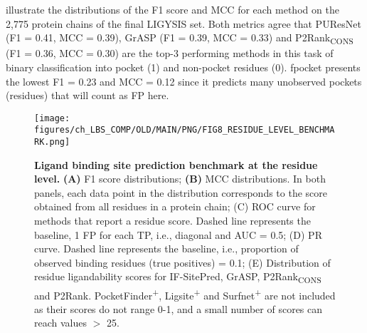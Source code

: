  illustrate the distributions of the F1 score and MCC for each method on the 2,775 protein chains of the final LIGYSIS set. Both metrics agree that PUResNet (F1 = 0.41, MCC = 0.39), GrASP (F1 = 0.39, MCC = 0.33) and P2Rank\textsubscript{CONS} (F1 = 0.36, MCC = 0.30) are the top-3 performing methods in this task of binary classification into pocket (1) and non-pocket residues (0). fpocket presents the lowest F1 = 0.23 and MCC = 0.12 since it predicts many unobserved pockets (residues) that will count as FP here.

\begin{figure}[ht!]
    \centering
    \texttt{[image: figures/ch\_LBS\_COMP/OLD/MAIN/PNG/FIG8\_RESIDUE\_LEVEL\_BENCHMARK.png]}
    \caption[Ligand binding site prediction benchmark at the residue level]{\textbf{Ligand binding site prediction benchmark at the residue level.} \textbf{(A)} F1 score distributions; \textbf{(B)} MCC distributions. In both panels, each data point in the distribution corresponds to the score obtained from all residues in a protein chain; (C) ROC curve for methods that report a residue score. Dashed line represents the baseline, 1 FP for each TP, i.e., diagonal and AUC = 0.5; (D) PR curve. Dashed line represents the baseline, i.e., proportion of observed binding residues (true positives) = 0.1; (E) Distribution of residue ligandability scores for IF-SitePred, GrASP, P2Rank\textsubscript{CONS} and P2Rank. PocketFinder\textsuperscript{+}, Ligsite\textsuperscript{+} and Surfnet\textsuperscript{+} are not included as their scores do not range 0-1, and a small number of scores can reach values $>$ 25.}
    \label{fig:residue_level_benchmark}
\end{figure}

